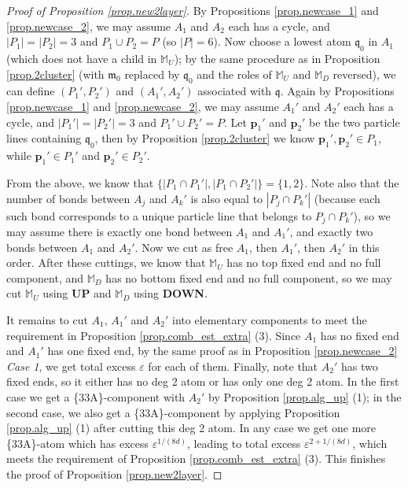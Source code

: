 \documentclass[10pt, reqno]{amsart}
\newcommand{\pb}{{\boldsymbol{p}}}
\newcommand{\Mb}{\mathbb M}
\newcommand{\mf}{\mathfrak m}
\newcommand{\qf}{\mathfrak q}
\theoremstyle{definition}
\theoremstyle{remark}
\numberwithin{equation}{section}
\begin{document}
\begin{proof}[Proof of Proposition \ref{prop.new2layer}] By Propositions \ref{prop.newcase_1} and \ref{prop.newcase_2}, we may assume $A_1$ and $A_2$ each has a cycle, and $|P_1|=|P_2|=3$ and $P_1\cup P_2=P$ (so $|P|=6$). Now choose a lowest atom $\qf_0$ in $A_1$ (which does not have a child in $\Mb_U$); by the same procedure as in Proposition \ref{prop.2cluster} (with $\mf_0$ replaced by $\qf_0$ and the roles of $\Mb_U$ and $\Mb_D$ reversed), we can define $(P_1',P_2')$ and $(A_1',A_2')$ associated with $\qf$. Again by Propositions \ref{prop.newcase_1} and \ref{prop.newcase_2}, we may assume $A_1'$ and $A_2'$ each has a cycle, and $|P_1'|=|P_2'|=3$ and $P_1'\cup P_2'=P$. Let $\pb_1'$ and $\pb_2'$ be the two particle lines containing $\qf_0$, then by Proposition \ref{prop.2cluster} we know $\pb_1',\pb_2'\in P_1$, while $\pb_1'\in P_1'$ and $\pb_2'\in P_2'$.

From the above, we know that $\{|P_1\cap P_1'|,|P_1\cap P_2'|\}=\{1,2\}$. Note also that the number of bonds between $A_j$ and $A_k'$ is also equal to $|P_j\cap P_k'|$ (because each such bond corresponds to a unique particle line that belongs to $P_j\cap P_k'$), so we may assume there is exactly one bond between $A_1$ and $A_1'$, and exactly two bonds between $A_1$ and $A_2'$. Now we cut as free $A_1$, then $A_1'$, then $A_2'$ in this order. After these cuttings, we know that $\Mb_U$ has no top fixed end and no full component, and $\Mb_D$ has no bottom fixed end and no full component, so we may cut $\Mb_U$ using \textbf{UP} and $\Mb_D$ using \textbf{DOWN}.

It remains to cut $A_1$, $A_1'$ and $A_2'$ into elementary components to meet the requirement in Proposition \ref{prop.comb_est_extra} (3). Since $A_1$ has no fixed end and $A_1'$ has one fixed end, by the same proof as in Proposition \ref{prop.newcase_2} \emph{Case 1}, we get total excess $\varepsilon$ for each of them. Finally, note that $A_2'$ has two fixed ends, so it either has no deg 2 atom or has only one deg 2 atom. In the first case we get a \{33A\}-component with $A_2'$ by Proposition \ref{prop.alg_up} (1); in the second case, we also get a \{33A\}-component by applying Proposition \ref{prop.alg_up} (1) after cutting this deg 2 atom. In any case we get one more \{33A\}-atom which has excess $\varepsilon^{1/(8d)}$, leading to total excess $\varepsilon^{2+1/(8d)}$, which meets the requirement of Proposition \ref{prop.comb_est_extra} (3). This finishes the proof of Proposition \ref{prop.new2layer}.
\end{proof}
\end{document}
